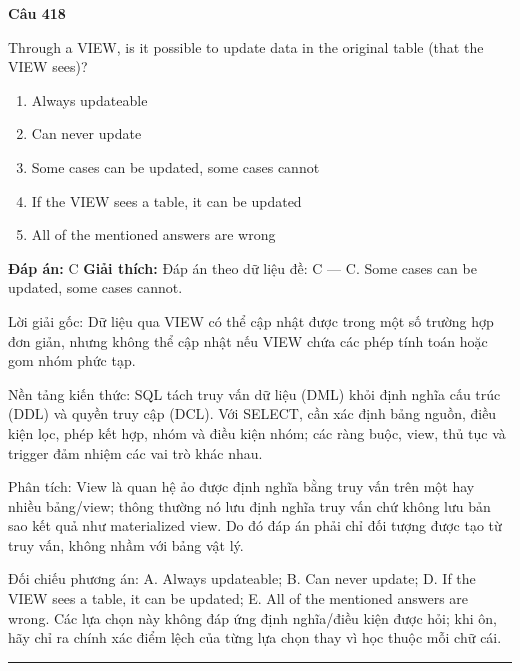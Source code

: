 \documentclass[11pt,a4paper]{article}
\newenvironment{question}[1]{%
  \par\vspace{1em}\noindent\textbf{\large Câu #1}\par\vspace{0.4em}
}{%
  \par\vspace{1em}\hrule\vspace{0.6em}
}
\newenvironment{choices}{%
  \begin{enumerate}[label=\textbf{\Alph*.},leftmargin=2.2em,itemsep=2pt,topsep=3pt]
}{%
  \end{enumerate}
}
\newcommand{\choice}{\item}
\begin{document}
\begin{question}{418}
Through a VIEW, is it possible to update data in the original table (that the VIEW sees)?
\begin{choices}
\choice Always updateable
\choice Can never update
\choice Some cases can be updated, some cases cannot
\choice If the VIEW sees a table, it can be updated
\choice All of the mentioned answers are wrong
\end{choices}
\textbf{Đáp án:} C
\textbf{Giải thích:} Đáp án theo dữ liệu đề: C — C. Some cases can be updated, some cases cannot.

Lời giải gốc: Dữ liệu qua VIEW có thể cập nhật được trong một số trường hợp đơn giản, nhưng không thể cập nhật nếu VIEW chứa các phép tính toán hoặc gom nhóm phức tạp.

Nền tảng kiến thức: SQL tách truy vấn dữ liệu (DML) khỏi định nghĩa cấu trúc (DDL) và quyền truy cập (DCL). Với SELECT, cần xác định bảng nguồn, điều kiện lọc, phép kết hợp, nhóm và điều kiện nhóm; các ràng buộc, view, thủ tục và trigger đảm nhiệm các vai trò khác nhau.

Phân tích: View là quan hệ ảo được định nghĩa bằng truy vấn trên một hay nhiều bảng/view; thông thường nó lưu định nghĩa truy vấn chứ không lưu bản sao kết quả như materialized view. Do đó đáp án phải chỉ đối tượng được tạo từ truy vấn, không nhầm với bảng vật lý.

Đối chiếu phương án: A. Always updateable; B. Can never update; D. If the VIEW sees a table, it can be updated; E. All of the mentioned answers are wrong. Các lựa chọn này không đáp ứng định nghĩa/điều kiện được hỏi; khi ôn, hãy chỉ ra chính xác điểm lệch của từng lựa chọn thay vì học thuộc mỗi chữ cái.
\end{question}
\end{document}
